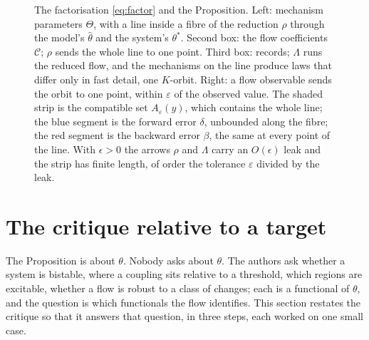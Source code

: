 \documentclass[10pt]{article}
\begin{document}
\begin{figure}[htbp]
{}
\caption{The factorisation \eqref{eq:factor} and the Proposition. Left: mechanism parameters $\Theta$, with a line inside a fibre of the reduction $\rho$ through the model's $\hat\theta$ and the system's $\theta^{*}$. Second box: the flow coefficients $\mathcal{C}$; $\rho$ sends the whole line to one point. Third box: records; $\Lambda$ runs the reduced flow, and the mechanisms on the line produce laws that differ only in fast detail, one $K$-orbit. Right: a flow observable sends the orbit to one point, within $\varepsilon$ of the observed value. The shaded strip is the compatible set $A_\varepsilon(y)$, which contains the whole line; the blue segment is the forward error $\delta$, unbounded along the fibre; the red segment is the backward error $\beta$, the same at every point of the line. With $\epsilon>0$ the arrows $\rho$ and $\Lambda$ carry an $O(\epsilon)$ leak and the strip has finite length, of order the tolerance $\varepsilon$ divided by the leak.}
\label{fig:prop}
\end{figure}

\section{The critique relative to a target}
The Proposition is about $\theta$. Nobody asks about $\theta$. The authors ask whether a system is bistable, where a coupling sits relative to a threshold, which regions are excitable, whether a flow is robust to a class of changes; each is a functional of $\theta$, and the question is which functionals the flow identifies. This section restates the critique so that it answers that question, in three steps, each worked on one small case.
\end{document}
